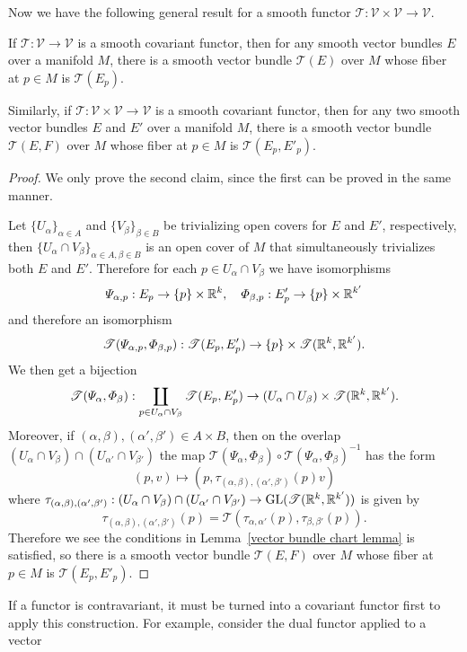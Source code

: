 Now we have the following general result for a smooth functor $\mathscr{T}:\mathcal{V}\times\mathcal{V}\to\mathcal{V}$.
\begin{proposition}
If $\mathscr{T}:\mathcal{V}\to\mathcal{V}$ is a smooth covariant functor, then for any smooth vector bundles $E$ over a manifold $M$, there is a smooth 
vector bundle $\mathscr{T}(E)$ over $M$ whose fiber at $p\in M$ is $\mathscr{T}(E_p)$.\par
Similarly, if $\mathscr{T}:\mathcal{V}\times\mathcal{V}\to\mathcal{V}$ is a smooth covariant functor, then for any two smooth vector bundles $E$ and $E'$ over a 
manifold $M$, there is a smooth vector bundle $\mathscr{T}(E,F)$ over $M$ whose fiber at $p\in M$ is $\mathscr{T}(E_p,E'_p)$.
\end{proposition}
\begin{proof}
We only prove the second claim, since the first can be proved in the same manner.\par
Let $\{U_\alpha\}_{\alpha\in A}$ and $\{V_\beta\}_{\beta\in B}$ be trivializing open covers for $E$ and $E'$, respectively, then $\{U_\alpha\cap V_\beta\}_{\alpha\in A,\beta\in B}$ 
is an open cover of $M$ that simultaneously trivializes both $E$ and $E'$. Therefore for each $p\in U_\alpha\cap V_{\beta}$ we have isomorphisms
\[\varPsi_{\alpha,p}:E_p\to\{p\}\times\mathbb{R}^k,\quad \varPhi_{\beta,p}:E'_p\to\{p\}\times\mathbb{R}^{k'}\]
and therefore an isomorphism
\[\mathscr{T}(\varPsi_{\alpha,p},\varPhi_{\beta,p}):\mathscr{T}(E_p,E'_p)\to\{p\}\times\mathscr{T}(\mathbb{R}^{k},\mathbb{R}^{k'}).\]
We then get a bijection
\[\mathscr{T}(\varPsi_\alpha,\varPhi_\beta):\coprod_{p\in U_{\alpha}\cap V_{\beta}}\mathscr{T}(E_p,E'_p)\to (U_\alpha\cap U_{\beta})\times\mathscr{T}(\mathbb{R}^{k},\mathbb{R}^{k'}).\]
Moreover, if $(\alpha,\beta),(\alpha',\beta')\in A\times B$, then on the overlap $(U_\alpha\cap V_\beta)\cap(U_{\alpha'}\cap V_{\beta'})$ the map $\mathscr{T}(\varPsi_\alpha,\varPhi_\beta)\circ\mathscr{T}(\varPsi_\alpha,\varPhi_\beta)^{-1}$ 
has the form
\[(p,v)\mapsto(p,\tau_{(\alpha,\beta),(\alpha',\beta')}(p)v)\]
where $\tau_{(\alpha,\beta),(\alpha',\beta')}:(U_\alpha\cap V_\beta)\cap(U_{\alpha'}\cap V_{\beta'})\to\mathrm{GL}(\mathscr{T}(\mathbb{R}^k,\mathbb{R}^{k'}))$ is given by
\[\tau_{(\alpha,\beta),(\alpha',\beta')}(p)=\mathscr{T}(\tau_{\alpha,\alpha'}(p),\tau_{\beta,\beta'}(p)).\]
Therefore we see the conditions in Lemma~\ref{vector bundle chart lemma} is satisfied, so there is a smooth vector bundle $\mathscr{T}(E,F)$ over $M$ whose fiber at 
$p\in M$ is $\mathscr{T}(E_p,E'_p)$. 
\end{proof}
If a functor is contravariant, it must be turned into a covariant functor first to apply this construction. For example, consider the dual functor applied to a vector 
